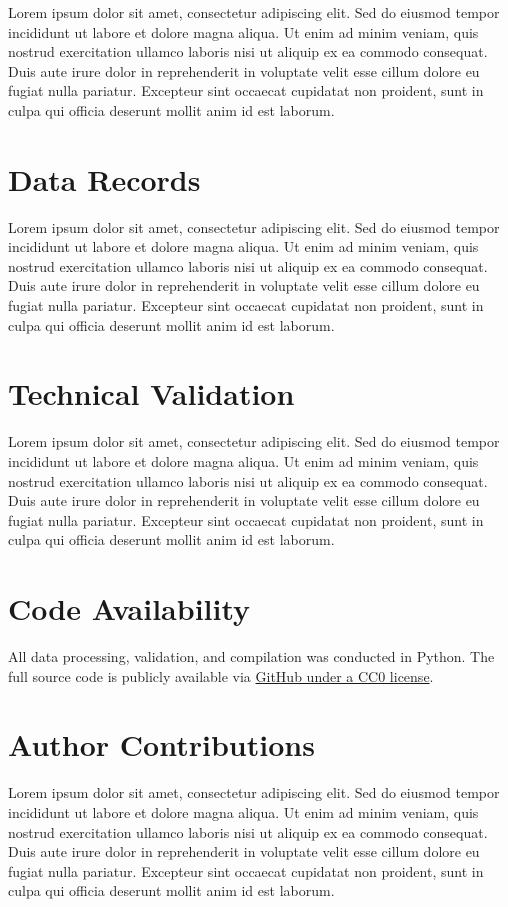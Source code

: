 \documentclass[11pt]{article}
\begin{document}
Lorem ipsum dolor sit amet, consectetur adipiscing elit. Sed do eiusmod tempor incididunt ut labore et dolore magna aliqua. Ut enim ad minim veniam, quis nostrud exercitation ullamco laboris nisi ut aliquip ex ea commodo consequat. Duis aute irure dolor in reprehenderit in voluptate velit esse cillum dolore eu fugiat nulla pariatur. Excepteur sint occaecat cupidatat non proident, sunt in culpa qui officia deserunt mollit anim id est laborum.

\section*{Data Records}
Lorem ipsum dolor sit amet, consectetur adipiscing elit. Sed do eiusmod tempor incididunt ut labore et dolore magna aliqua. Ut enim ad minim veniam, quis nostrud exercitation ullamco laboris nisi ut aliquip ex ea commodo consequat. Duis aute irure dolor in reprehenderit in voluptate velit esse cillum dolore eu fugiat nulla pariatur. Excepteur sint occaecat cupidatat non proident, sunt in culpa qui officia deserunt mollit anim id est laborum.

\section*{Technical Validation}
Lorem ipsum dolor sit amet, consectetur adipiscing elit. Sed do eiusmod tempor incididunt ut labore et dolore magna aliqua. Ut enim ad minim veniam, quis nostrud exercitation ullamco laboris nisi ut aliquip ex ea commodo consequat. Duis aute irure dolor in reprehenderit in voluptate velit esse cillum dolore eu fugiat nulla pariatur. Excepteur sint occaecat cupidatat non proident, sunt in culpa qui officia deserunt mollit anim id est laborum.

\section*{Code Availability}

All data processing, validation, and compilation was conducted in Python. The full source code is publicly available via \href{https://github.com/Thevesh/paper-malaysian-election-corpus-maps}{GitHub under a CC0 license}.

\begingroup
\raggedright
\linespread{1.1}
\small
\let\oldthebibliography\thebibliography

\endgroup

\section*{Author Contributions}
Lorem ipsum dolor sit amet, consectetur adipiscing elit. Sed do eiusmod tempor incididunt ut labore et dolore magna aliqua. Ut enim ad minim veniam, quis nostrud exercitation ullamco laboris nisi ut aliquip ex ea commodo consequat. Duis aute irure dolor in reprehenderit in voluptate velit esse cillum dolore eu fugiat nulla pariatur. Excepteur sint occaecat cupidatat non proident, sunt in culpa qui officia deserunt mollit anim id est laborum.
\end{document}
